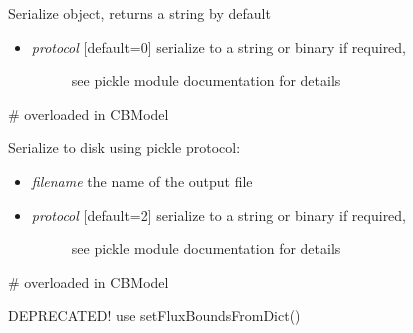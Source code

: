 \documentclass[a4paper,11pt,english]{sphinxmanual}
\begin{document}
\begin{fulllineitems}
\begin{fulllineitems}
\end{fulllineitems}


\begin{fulllineitems}
\label{modules_doc:cbmpy.CBModel.Model.serialize}
Serialize object, returns a string by default
\begin{itemize}
\item {} \begin{description}
\item[{\emph{protocol} {[}default=0{]} serialize to a string or binary if required,}] \leavevmode
see pickle module documentation for details

\end{description}

\end{itemize}

\# overloaded in CBModel

\end{fulllineitems}


\begin{fulllineitems}
\label{modules_doc:cbmpy.CBModel.Model.serializeToDisk}
Serialize to disk using pickle protocol:
\begin{itemize}
\item {} 
\emph{filename} the name of the output file

\item {} \begin{description}
\item[{\emph{protocol} {[}default=2{]} serialize to a string or binary if required,}] \leavevmode
see pickle module documentation for details

\end{description}

\end{itemize}

\# overloaded in CBModel

\end{fulllineitems}


\begin{fulllineitems}
\label{modules_doc:cbmpy.CBModel.Model.setAllFluxBounds}
DEPRECATED! use setFluxBoundsFromDict()


\end{fulllineitems}
\end{fulllineitems}
\end{document}
